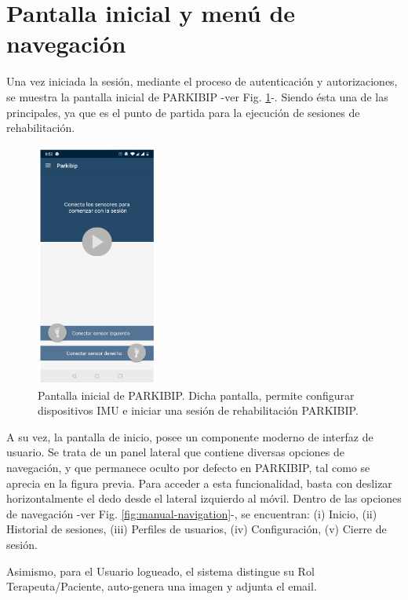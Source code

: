 \section{Pantalla inicial y menú de navegación}

Una vez iniciada la sesión, mediante el proceso de autenticación y autorizaciones, se muestra la pantalla inicial de PARKIBIP -ver Fig. \ref{fig:manual-home}-. Siendo ésta una de las principales, ya que es el punto de partida para la ejecución de sesiones de rehabilitación.

\newpage

\begin{figure}[H]
 \centering
 \includegraphics[height=8cm]{TESIS/imagenes/user-manual/manual-home.PNG}
 \caption{Pantalla inicial de PARKIBIP. Dicha pantalla, permite configurar dispositivos IMU e iniciar una sesión de rehabilitación PARKIBIP.}
 \label{fig:manual-home}
\end{figure}

A su vez, la pantalla de inicio, posee un componente moderno de interfaz de usuario. Se trata de un panel lateral que contiene diversas opciones de navegación, y que permanece oculto por defecto en PARKIBIP, tal como se aprecia en la figura previa. Para acceder a esta funcionalidad, basta con deslizar horizontalmente el dedo desde el lateral izquierdo al móvil. Dentro de las opciones de navegación -ver Fig. \ref{fig:manual-navigation}-, se encuentran: (i) Inicio, (ii) Historial de sesiones, (iii) Perfiles de usuarios, (iv) Configuración, (v) Cierre de sesión.

Asimismo, para el Usuario logueado, el sistema distingue su Rol Terapeuta/Paciente, auto-genera una imagen y adjunta el email.

\newpage

